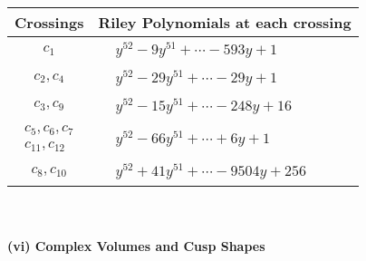\documentclass[1p]{elsarticle_modified}
\theoremstyle{definition}
\begin{document}
\begin{tabular}{m{50pt}|m{274pt}}
Crossings & \hspace{64pt}Riley Polynomials at each crossing \\
\hline $$\begin{aligned}c_{1}\end{aligned}$$&$\begin{aligned}
&y^{52}-9 y^{51}+\cdots-593 y+1
\end{aligned}$\\
\hline $$\begin{aligned}c_{2},c_{4}\end{aligned}$$&$\begin{aligned}
&y^{52}-29 y^{51}+\cdots-29 y+1
\end{aligned}$\\
\hline $$\begin{aligned}c_{3},c_{9}\end{aligned}$$&$\begin{aligned}
&y^{52}-15 y^{51}+\cdots-248 y+16
\end{aligned}$\\
\hline $$\begin{aligned}c_{5},c_{6},c_{7}\\c_{11},c_{12}\end{aligned}$$&$\begin{aligned}
&y^{52}-66 y^{51}+\cdots+6 y+1
\end{aligned}$\\
\hline $$\begin{aligned}c_{8},c_{10}\end{aligned}$$&$\begin{aligned}
&y^{52}+41 y^{51}+\cdots-9504 y+256
\end{aligned}$\\
\hline
\end{tabular}\\~\\
\newpage\flushleft \textbf{(vi) Complex Volumes and Cusp Shapes}
\end{document}
